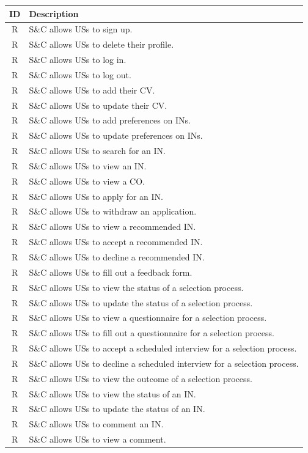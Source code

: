 \setcounter{r}{1}
\newcommand{\rc}{\ther\stepcounter{r}}
\renewcommand{\arraystretch}{1.5}
\begin{longtable}{|c|p{10.5cm}|}
    \hline \rowcolor{polimiblue!40}
    \textbf{ID} & \textbf{Description} \\ \hline
    R\rc & S\&C allows USs to sign up. \\ \hline
    R\rc & S\&C allows USs to delete their profile.\\ \hline
    R\rc & S\&C allows USs to log in. \\ \hline
    R\rc & S\&C allows USs to log out. \\ \hline
    R\rc & S\&C allows USs to add their CV. \\ \hline
    R\rc & S\&C allows USs to update their CV. \\ \hline
    R\rc & S\&C allows USs to add preferences on INs. \\ \hline
    R\rc & S\&C allows USs to update preferences on INs. \\ \hline
    R\rc & S\&C allows USs to search for an IN. \\ \hline
    R\rc & S\&C allows USs to view an IN. \\ \hline
    R\rc & S\&C allows USs to view a CO. \\ \hline
    R\rc & S\&C allows USs to apply for an IN. \\ \hline
    R\rc & S\&C allows USs to withdraw an application. \\ \hline
    R\rc & S\&C allows USs to view a recommended IN. \\ \hline
    R\rc & S\&C allows USs to accept a recommended IN. \\ \hline
    R\rc & S\&C allows USs to decline a recommended IN. \\ \hline
    R\rc & S\&C allows USs to fill out a feedback form. \\ \hline
    R\rc & S\&C allows USs to view the status of a selection process. \\ \hline
    R\rc & S\&C allows USs to update the status of a selection process. \\ \hline
    R\rc & S\&C allows USs to view a questionnaire for a selection process. \\ \hline
    R\rc & S\&C allows USs to fill out a questionnaire for a selection process. \\ \hline
    R\rc & S\&C allows USs to accept a scheduled interview for a selection process. \\ \hline
    R\rc & S\&C allows USs to decline a scheduled interview for a selection process. \\ \hline
    R\rc & S\&C allows USs to view the outcome of a selection process. \\ \hline
    R\rc & S\&C allows USs to view the status of an IN. \\ \hline
    R\rc & S\&C allows USs to update the status of an IN. \\ \hline
    R\rc & S\&C allows USs to comment an IN. \\ \hline
    R\rc & S\&C allows USs to view a comment. \\ \hline


\end{longtable}
